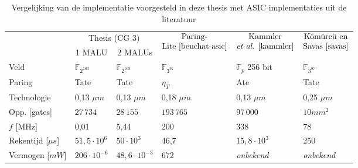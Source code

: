 \begin{table}[h]
	\caption{Vergelijking van de implementatie voorgesteld in deze thesis met ASIC implementaties uit de literatuur}
	\label{tabel-resultaten-asic}

	\begin{narrow}{-2cm}{-2cm}
		\centering
		\begin{tabular}{llllll}
			\toprule
			&	\multicolumn{2}{c}{Thesis (CG 3)\footnotemark[2]}	& \multirow{2}{*}{$\begin{array}{@{}c@{}}\text{Paring-}\\\text{Lite \cite{beuchat-asic}}\end{array}$}	& \multicolumn{1}{c}{\multirow{2}{*}{$\begin{array}{@{}c@{}}\text{Kammler}\\\text{\emph{et al.} \cite{kammler}}\end{array}$}}	&  \multicolumn{1}{c}{\multirow{2}{*}{$\begin{array}{@{}c@{}}\text{K\"om\"urc\"u en}\\\text{Savas \cite{savas}}\end{array}$}}\\
			\cmidrule(r){2-3}
			& \multicolumn{1}{c}{1 MALU} & \multicolumn{1}{c}{2 MALUs} & & &\\
	 		\midrule
			Veld																				& $\mathbb{F}_{2^{163}}$	& $\mathbb{F}_{2^{163}}$	& $\mathbb{F}_{3^{97}}$	& $\mathbb{F}_{p}$ 256 bit	& $\mathbb{F}_{3^{97}}$ \\
			Paring																			& Tate							& Tate							& $\eta_T$					& Ate			 					& Tate\\
			Technologie																		& 0,13 $\mu m$					& 0,13 $\mu m$					& 0,18 $\mu m$				& 0,13 $\mu m$					& 0,25 $\mu m$\\
			Opp. [gates]																	& $27\,734$						& $28\,155$						& $193\,765$				& $97\,000$						& \emph{$10 mm^2$}\footnotemark[3]\\
			$f$ [MHz]																		& 0,01							& 5,44							& 200							& 338								& 78\\
			Rekentijd [$\mu s$]															& $51,5 \cdot 10^6$			& $50 \cdot 10^3$				& 46,7						& $15,8 \cdot 10^3$			& 250\footnotemark[4]\\
			Vermogen [$mW$]																& $206 \cdot 10^{-6}$		& $48,6 \cdot 10^{-3}$		& 672							& \emph{onbekend}				& \emph{onbekend}\\
			\bottomrule		
		\end{tabular}
	\end{narrow}
	

\end{table}
